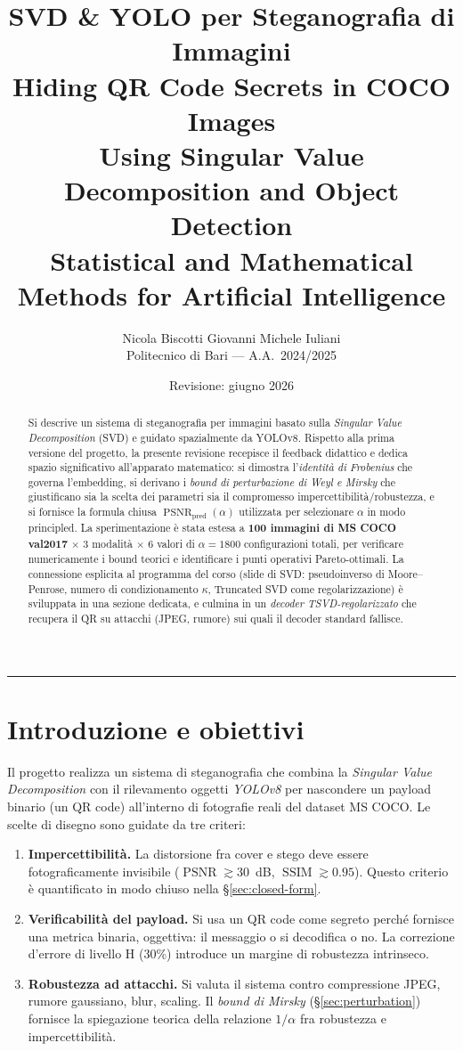 \documentclass[11pt,a4paper]{article}
\title{\textbf{SVD \& YOLO per Steganografia di Immagini}\\
       \large Hiding QR Code Secrets in COCO Images\\
       Using Singular Value Decomposition and Object Detection\\[1ex]
       \normalsize Statistical and Mathematical Methods for Artificial Intelligence}
\author{Nicola Biscotti \quad Giovanni Michele Iuliani\\
        Politecnico di Bari --- A.A.\ 2024/2025}
\date{Revisione: giugno 2026}
\theoremstyle{definition}
\theoremstyle{remark}
\DeclareMathOperator{\PSNR}{PSNR}
\DeclareMathOperator{\SSIM}{SSIM}
\begin{document}
\maketitle

\begin{abstract}
\noindent
Si descrive un sistema di steganografia per immagini basato sulla
\emph{Singular Value Decomposition} (SVD) e guidato spazialmente da
YOLOv8.  Rispetto alla prima versione del progetto, la presente revisione
recepisce il feedback didattico e dedica spazio significativo
all'apparato matematico: si dimostra l'\emph{identità di Frobenius} che
governa l'embedding, si derivano i \emph{bound di perturbazione di Weyl e
Mirsky} che giustificano sia la scelta dei parametri sia il
compromesso impercettibilità/robustezza, e si fornisce la formula
chiusa $\PSNR_{\text{pred}}(\alpha)$ utilizzata per selezionare
$\alpha$ in modo principled.  La sperimentazione \`e stata estesa a
\textbf{100 immagini di MS COCO val2017} $\times$ 3 modalit\`a
$\times$ 6 valori di $\alpha = 1800$ configurazioni totali, per
verificare numericamente i bound teorici e identificare i punti operativi
Pareto-ottimali.  La connessione esplicita al programma del corso
(slide di SVD: pseudoinverso di Moore--Penrose, numero di
condizionamento $\kappa$, Truncated SVD come regolarizzazione)
\`e sviluppata in una sezione dedicata, e culmina in un \emph{decoder
TSVD-regolarizzato} che recupera il QR su attacchi (JPEG, rumore)
sui quali il decoder standard fallisce.
\end{abstract}

\tableofcontents
\bigskip\hrule\bigskip


\section{Introduzione e obiettivi}

Il progetto realizza un sistema di steganografia che combina la
\emph{Singular Value Decomposition} con il rilevamento oggetti
\emph{YOLOv8} per nascondere un payload binario (un QR code) all'interno
di fotografie reali del dataset MS COCO.  Le scelte di disegno sono
guidate da tre criteri:

\begin{enumerate}[leftmargin=*,itemsep=2pt]
  \item \textbf{Impercettibilità.}  La distorsione fra cover e stego deve
        essere fotograficamente invisibile ($\PSNR \gtrsim 30$~dB,
        $\SSIM \gtrsim 0.95$).  Questo criterio è quantificato in modo
        chiuso nella \S\ref{sec:closed-form}.
  \item \textbf{Verificabilità del payload.}  Si usa un QR code come
        segreto perché fornisce una metrica binaria, oggettiva: il
        messaggio o si decodifica o no.  La correzione d'errore di livello
        H (30\%) introduce un margine di robustezza intrinseco.
  \item \textbf{Robustezza ad attacchi.}  Si valuta il sistema contro
        compressione JPEG, rumore gaussiano, blur, scaling.
        Il \emph{bound di Mirsky} (\S\ref{sec:perturbation}) fornisce la
        spiegazione teorica della relazione $1/\alpha$ fra robustezza
        e impercettibilità.
\end{enumerate}
\end{document}
